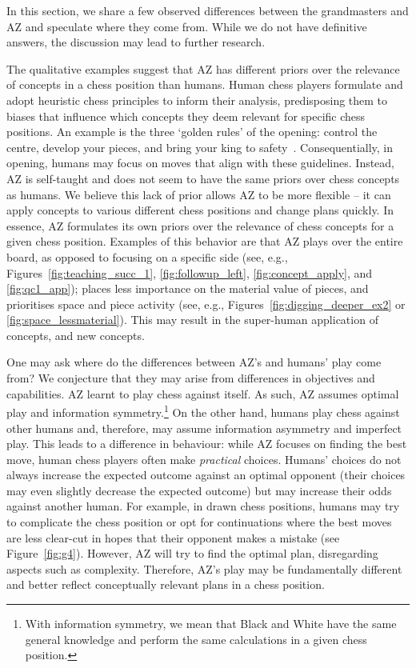 \documentclass{article}
\begin{document}
In this section, we share a few observed differences between the grandmasters and AZ and speculate where they come from. While we do not have definitive answers, the discussion may lead to further research. 

The qualitative examples suggest that AZ has different priors over the relevance of concepts in a chess position than humans. 
Human chess players formulate and adopt heuristic chess principles to inform their analysis, predisposing them to biases that influence which concepts they deem relevant for specific chess positions. An example is the three `golden rules' of the opening: control the centre, develop your pieces, and bring your king to safety~\citep{openings_carsten, step_method, 10goldenrules}.
Consequentially, in opening, humans may focus on moves that align with these guidelines. 
Instead, AZ is self-taught and does not seem to have the same priors over chess concepts as humans. 
We believe this lack of prior allows AZ to be more flexible -- it can apply concepts to various different chess positions and change plans quickly.
In essence, AZ formulates its own priors over the relevance of chess concepts for a given chess position.
Examples of this behavior are that AZ plays over the entire board, as opposed to focusing on a specific side (see, e.g., Figures~\ref{fig:teaching_succ_1}, \ref{fig:followup_left}, \ref{fig:concept_apply}, and \ref{fig:qc1_app}); places less importance on the material value of pieces, and prioritises space and piece activity (see, e.g., Figures~\ref{fig:digging_deeper_ex2} or \ref{fig:space_lessmaterial}).
This may result in the super-human application of concepts, and new concepts.  

One may ask where do the differences between AZ's and humans' play come from? We conjecture that they may arise from differences in objectives and capabilities.
AZ learnt to play chess against itself. As such, AZ assumes optimal play and information symmetry.\footnote{With information symmetry, we mean that Black and White have the same general knowledge and perform the same calculations in a given chess position.}
On the other hand, humans play chess against other humans and, therefore, may assume information asymmetry and imperfect play. 
This leads to a difference in behaviour: while AZ focuses on finding the best move, human chess players often make \textit{practical} choices. 
Humans' choices do not always increase the expected outcome against an optimal opponent (their choices may even slightly decrease the expected outcome) but may increase their odds against another human.
For example, in drawn chess positions, humans may try to complicate the chess position or opt for continuations where the best moves are less clear-cut in hopes that their opponent makes a mistake (see Figure~\ref{fig:g4}). 
However, AZ will try to find the optimal plan, disregarding aspects such as complexity. Therefore, AZ's play may be fundamentally different and better reflect conceptually relevant plans in a chess position.  
\end{document}
